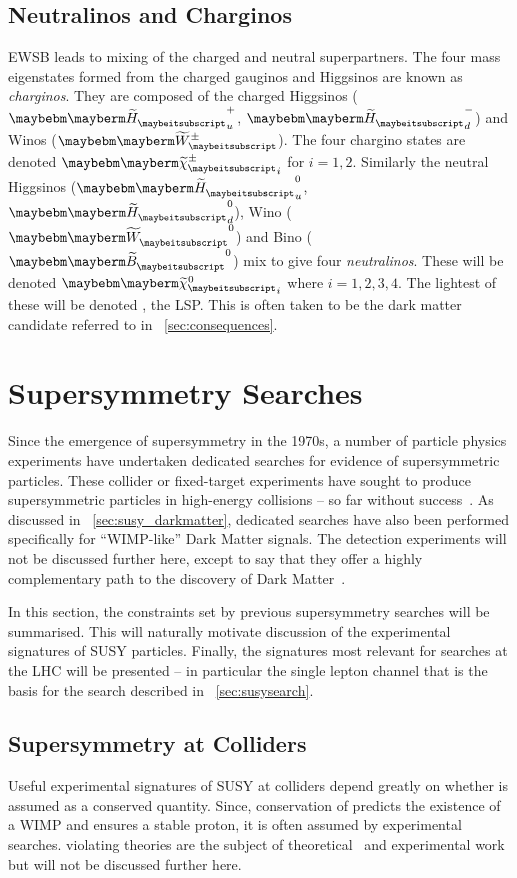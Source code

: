 \subsection{Neutralinos and Charginos}
\ac{EWSB} leads to mixing of the charged and neutral \spinhalf
superpartners. The four mass eigenstates formed from the charged
gauginos and Higgsinos are known as \emph{charginos}. They are
composed of the charged Higgsinos ($\PSHiggs_u^+$, $\PSHiggs_d^-$) and
Winos ($\PSWpm$). The four chargino states are denoted
$\PScharginopm_i$ for $i=1,2$. Similarly the neutral Higgsinos
($\PSHiggs_u^0$, $\PSHiggs_d^0$), Wino ($\PSW^0$) and Bino ($\PSB^0$)
mix to give four \emph{neutralinos}. These will be denoted
$\PSneutralino_i$ where $i=1,2,3,4$. The lightest of these will be
denoted \PSneutralino, the \ac{LSP}. This is often taken to be the
dark matter candidate referred to in \sec~\ref{sec:consequences}.

\section{Supersymmetry Searches}
Since the emergence of supersymmetry in the 1970s, a number of particle physics
experiments have undertaken dedicated searches for evidence of supersymmetric
particles. These collider or fixed-target experiments have sought to produce
supersymmetric particles in high-energy collisions -- so far without
success~\cite{ua1_susy,aleph_susy,d0_susy,hera_susy}. As discussed in
\sec~\ref{sec:susy_darkmatter}, dedicated searches have also been performed
specifically for ``\ac{WIMP}-like'' Dark Matter signals. The detection
experiments will not be discussed further here, except to say that they offer a
highly complementary path to the discovery of Dark
Matter~\cite{mastercode_2011}.

In this section, the constraints set by previous supersymmetry searches will be
summarised. This will naturally motivate discussion of the experimental
signatures of \ac{SUSY} particles. Finally, the signatures most relevant for
searches at the \ac{LHC} will be presented -- in particular the single lepton
channel that is the basis for the search described in
\chap~\ref{sec:susysearch}.

\subsection{Supersymmetry at Colliders}
Useful experimental signatures of \ac{SUSY} at colliders depend greatly on
whether \Rparity is assumed as a conserved quantity. Since, conservation of
\Rparity predicts the existence of a \ac{WIMP} and ensures a stable proton, it
is often assumed by experimental searches. \Rparity violating theories are the
subject of theoretical~\cite{aulakh_rpv} and experimental work but will not be
discussed further here.

